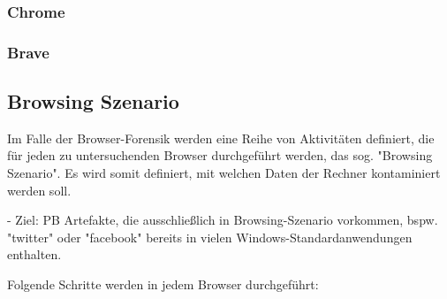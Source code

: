 \subsubsection*{Chrome}
\label{subsubsection:methodik-vorbereitung-browserauswahl-chrome}

\subsubsection*{Brave}
\label{subsubsection:methodik-vorbereitung-browserauswahl-brave}

\subsection{Browsing Szenario}
\label{subsection:methodik-vorbereitung-browsing-szenario}
Im Falle der Browser-Forensik werden eine Reihe von Aktivitäten definiert, die für jeden zu untersuchenden Browser durchgeführt werden, das sog. "Browsing Szenario".
Es wird somit definiert, mit welchen Daten der Rechner kontaminiert werden soll.

- Ziel: PB Artefakte, die ausschließlich in Browsing-Szenario vorkommen, bspw. "twitter" oder "facebook" bereits in vielen Windows-Standardanwendungen enthalten.

Folgende Schritte werden in jedem Browser durchgeführt: 

